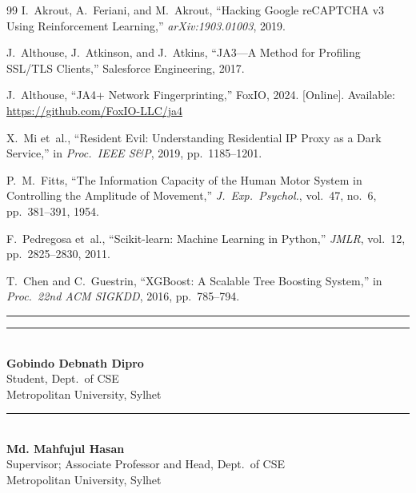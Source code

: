 \documentclass[12pt, a4paper]{article}
\begin{document}
\begin{thebibliography}{99}
I.~Akrout, A.~Feriani, and M.~Akrout, ``Hacking Google reCAPTCHA v3 Using Reinforcement Learning,'' \textit{arXiv:1903.01003}, 2019.

J.~Althouse, J.~Atkinson, and J.~Atkins, ``JA3---A Method for Profiling SSL/TLS Clients,'' Salesforce Engineering, 2017.

J.~Althouse, ``JA4+ Network Fingerprinting,'' FoxIO, 2024. [Online]. Available: \url{https://github.com/FoxIO-LLC/ja4}

X.~Mi et~al., ``Resident Evil: Understanding Residential IP Proxy as a Dark Service,'' in \textit{Proc.\ IEEE S\&P}, 2019, pp.~1185--1201.

P.~M.~Fitts, ``The Information Capacity of the Human Motor System in Controlling the Amplitude of Movement,'' \textit{J.~Exp.~Psychol.}, vol.~47, no.~6, pp.~381--391, 1954.

F.~Pedregosa et~al., ``Scikit-learn: Machine Learning in Python,'' \textit{JMLR}, vol.~12, pp.~2825--2830, 2011.

T.~Chen and C.~Guestrin, ``XGBoost: A Scalable Tree Boosting System,'' in \textit{Proc.\ 22nd ACM SIGKDD}, 2016, pp.~785--794.

\end{thebibliography}

\vspace{1cm}

{\color{metroBlue}\rule{\textwidth}{0.5pt}}

\vspace{0.6cm}

\noindent
\begin{minipage}[t]{0.45\textwidth}
\centering
\vspace{1.2cm}
{\color{metroGray}\rule{6cm}{0.4pt}}\\[0.2cm]
{\textbf{Gobindo Debnath Dipro}}\\
{\small Student, Dept.\ of CSE}\\
{\small Metropolitan University, Sylhet}
\end{minipage}
\hfill
\begin{minipage}[t]{0.45\textwidth}
\centering
\vspace{1.2cm}
{\color{metroGray}\rule{6cm}{0.4pt}}\\[0.2cm]
{\textbf{Md. Mahfujul Hasan}}\\
{\small Supervisor; Associate Professor and Head, Dept.\ of CSE}\\
{\small Metropolitan University, Sylhet}
\end{minipage}
\end{document}
